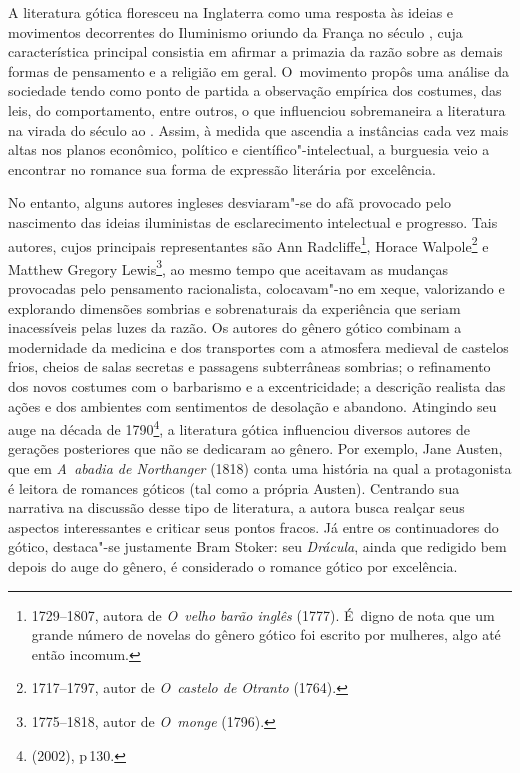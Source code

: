 
A literatura gótica floresceu na Inglaterra como uma resposta às ideias
e movimentos decorrentes do Iluminismo oriundo da França no século
, cuja característica principal consistia em afirmar a primazia da
razão sobre as demais formas de pensamento e a religião em geral. O~movimento propôs uma análise da sociedade tendo como ponto de partida a
observação empírica dos costumes, das leis, do comportamento, entre
outros, o que influenciou sobremaneira a literatura na virada do século
 ao . Assim, à medida que ascendia a instâncias cada vez mais
altas nos planos econômico, político e científico"-intelectual, a
burguesia veio a encontrar no romance sua forma de expressão literária
por excelência.

No entanto, alguns autores ingleses desviaram"-se do afã provocado pelo
nascimento das ideias iluministas de esclarecimento intelectual e
progresso. Tais autores, cujos principais representantes são Ann
Radcliffe\footnote{1729--1807, autora de \emph{O~velho barão
inglês} (1777). É~digno de nota que um grande número de novelas do
gênero gótico foi escrito por mulheres, algo até então incomum.},
Horace Walpole\footnote{1717--1797, autor de \emph{O~castelo de
Otranto} (1764).}
 e Matthew Gregory
 Lewis\footnote{1775--1818, autor de \emph{O~monge} (1796).}, 
ao mesmo tempo que aceitavam as mudanças
provocadas pelo pensamento racionalista, colocavam"-no em xeque,
valorizando e explorando dimensões sombrias e sobrenaturais da
experiência que seriam inacessíveis pelas luzes da razão. Os autores
do gênero gótico combinam a modernidade da medicina e dos transportes
com a atmosfera medieval de castelos frios, cheios de salas secretas e
passagens subterrâneas sombrias; o refinamento dos novos costumes com o
barbarismo e a excentricidade; a descrição realista das ações e dos
ambientes com sentimentos de desolação e abandono. Atingindo seu auge na
década de 1790\footnote{ (2002), p\,130.}, a literatura gótica influenciou
diversos autores de gerações posteriores que não se dedicaram ao gênero.
Por exemplo, Jane Austen, que em \emph{A~abadia de Northanger} (1818)
conta uma história na qual a protagonista é leitora de romances góticos
(tal como a própria Austen). Centrando sua narrativa na discussão desse
tipo de literatura, a autora busca realçar seus aspectos interessantes e
criticar seus pontos fracos. Já entre os continuadores do gótico,
destaca"-se justamente Bram Stoker: seu \emph{Drácula}, ainda que
redigido bem depois do auge do gênero, é considerado o romance gótico
por excelência.

